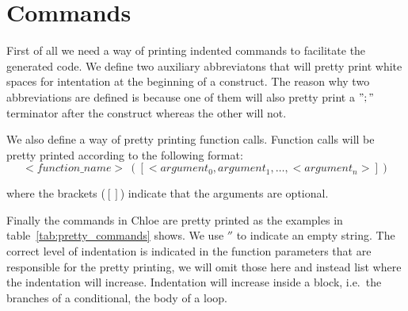 \section{Commands}
First of all we need a way of printing indented commands to facilitate the generated code.
We define two auxiliary abbreviatons that will pretty print white spaces for intentation at the beginning of a construct.
The reason why two abbreviations are defined is because one of them will also pretty print a $";"$ terminator after the construct whereas the other will not.

We also define a way of pretty printing function calls.
Function calls will be pretty printed according to the following format:
\begin{equation*}
<function\_name>\ ([<argument_0, argument_1, \dots, <argument_n>])
\end{equation*}

where the brackets ($[]$) indicate that the arguments are optional.

Finally the commands in Chloe are pretty printed as the examples in table~\ref{tab:pretty_commands} shows.
We use $''$ to indicate an empty string.
The correct level of indentation is indicated in the function parameters that are responsible for the pretty printing, we will omit those here and instead list where the indentation will increase.
Indentation will increase inside a block, i.e.\ the branches of a conditional, the body of a loop.

